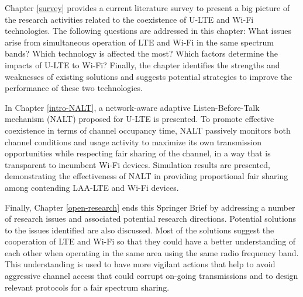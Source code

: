 Chapter \ref{survey} provides a current literature survey to present a big picture of the research activities related to the coexistence of \mbox{U-LTE} and \mbox{Wi-Fi} technologies. The following questions are addressed in this chapter: What issues arise from simultaneous operation of LTE and \mbox{Wi-Fi} in the same spectrum bands? Which technology is affected the most? Which factors determine the impacts of \mbox{U-LTE} to \mbox{Wi-Fi}?  \mbox{Finally}, the chapter identifies the strengths and weaknesses of existing solutions and suggests potential strategies to improve the performance of these two technologies.

In Chapter \ref{intro-NALT}, a network-aware adaptive Listen-Before-Talk mechanism (NALT) proposed for \mbox{U-LTE} is presented. To promote effective coexistence in terms of channel occupancy time, NALT passively monitors both channel conditions and usage activity to maximize its own transmission opportunities while respecting fair sharing of the channel, in a way that is transparent to incumbent \mbox{Wi-Fi} devices. Simulation results are presented, demonstrating the effectiveness of NALT in providing proportional fair sharing among contending \mbox{LAA-LTE} and \mbox{Wi-Fi} devices.

Finally, Chapter \ref{open-research} ends this Springer Brief by addressing a number of research issues and associated potential research directions. Potential solutions to the issues identified are also discussed. Most of the solutions suggest the cooperation of LTE and \mbox{Wi-Fi} so that they could have a better understanding of each other when operating in the same area using the same radio frequency band. This understanding is used to have more vigilant actions that help to avoid aggressive channel access that could corrupt on-going transmissions and to design relevant protocols for a fair spectrum sharing.


